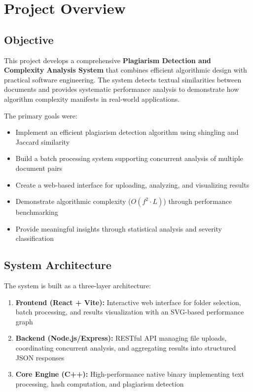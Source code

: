 \documentclass[12pt,oneside,openany]{report}
\begin{document}
\cleardoublepage
{}
{}
\tableofcontents

\cleardoublepage
{}
\setcounter{page}{1}

\chapter{Project Overview}

\section{Objective}

This project develops a comprehensive \textbf{Plagiarism Detection and Complexity Analysis System} that combines efficient algorithmic design with practical software engineering. The system detects textual similarities between documents and provides systematic performance analysis to demonstrate how algorithm complexity manifests in real-world applications.

The primary goals were:
\begin{itemize}
  \item Implement an efficient plagiarism detection algorithm using shingling and Jaccard similarity
  \item Build a batch processing system supporting concurrent analysis of multiple document pairs
  \item Create a web-based interface for uploading, analyzing, and visualizing results
  \item Demonstrate algorithmic complexity ($O(f^2 \cdot L)$) through performance benchmarking
  \item Provide meaningful insights through statistical analysis and severity classification
\end{itemize}

\section{System Architecture}

The system is built as a three-layer architecture:

\begin{enumerate}
  \item \textbf{Frontend (React + Vite):} Interactive web interface for folder selection, batch processing, and results visualization with an SVG-based performance graph
  
  \item \textbf{Backend (Node.js/Express):} RESTful API managing file uploads, coordinating concurrent analysis, and aggregating results into structured JSON responses
  
  \item \textbf{Core Engine (C++):} High-performance native binary implementing text processing, hash computation, and plagiarism detection
\end{enumerate}
\end{document}

